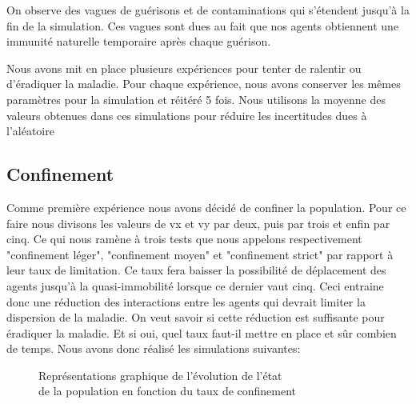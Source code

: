 \documentclass[a4paper, 12pt]{article}
\begin{document}
On observe des vagues de guérisons et de contaminations qui s'étendent jusqu'à la fin de la simulation. Ces
vagues sont dues au fait que nos agents obtiennent une immunité naturelle temporaire après chaque
guérison.

\vspace{0.8cm}

Nous avons mit en place plusieurs expériences pour tenter de ralentir ou d'éradiquer la maladie. Pour chaque
expérience, nous avons conserver les mêmes paramètres pour la simulation et réitéré 5 fois. Nous utilisons la
moyenne des valeurs obtenues dans ces simulations pour réduire les incertitudes dues à l'aléatoire

\newpage

\subsection{Confinement}
Comme première expérience nous avons décidé de confiner la population. Pour ce faire nous divisons les
valeurs de vx et vy par deux, puis par trois et enfin par cinq. Ce qui nous ramène à trois tests que nous
appelons respectivement "confinement léger", "confinement moyen" et "confinement strict" par rapport à leur
taux de limitation. Ce taux fera baisser la possibilité de déplacement des agents jusqu'à la quasi-immobilité
lorsque ce dernier vaut cinq. Ceci entraine donc une réduction des interactions entre les agents qui devrait
limiter la dispersion de la maladie. On veut savoir si cette réduction est suffisante pour éradiquer la maladie. Et
si oui, quel taux faut-il mettre en place et sûr combien de temps. Nous avons donc réalisé les simulations
suivantes:

\begin{figure}[!h]
	\centering
	\qquad
	\centering
	\qquad
	\caption{Représentations graphique de l'évolution de l'état\\ de la population en fonction du taux de confinement}

\end{figure}

\newpage
\end{document}
